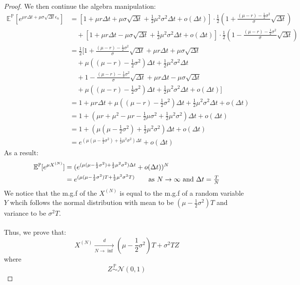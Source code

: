 \documentclass[12pt, letterpaper]{article}
\begin{document}
\begin{proof}
We then continue the algebra manipulation:
\begin{align*}
  \mathbb{E}^\mathbb{P} [e^{\mu r\Delta t+\mu\sigma \sqrt{\Delta t} \epsilon_n}] &= [1+\mu r\Delta t+\mu \sigma \sqrt{\Delta t} +\frac{1}{2}\mu^2\sigma^2\Delta t + o(\Delta t)] \cdot \frac{1}{2} (1 + \frac{(\mu -r) - \frac{1}{2}\sigma^2}{\sigma} \sqrt{\Delta t}) \\ 
    & \quad + [1+\mu r\Delta t-\mu \sigma \sqrt{\Delta t} +\frac{1}{2}\mu^2\sigma^2\Delta t + o(\Delta t)] \cdot \frac{1}{2} (1 - \frac{(\mu -r) - \frac{1}{2}\sigma^2}{\sigma} \sqrt{\Delta t}) \\
    &= \frac{1}{2}[ 1 + \frac{(\mu - r) - \frac{1}{2}\sigma^2}{\sigma}\sqrt{\Delta t} + \mu r \Delta t + \mu \sigma \sqrt{\Delta t} \\
    & \quad + \mu((\mu -r) - \frac{1}{2}\sigma^2)\Delta t + \frac{1}{2}\mu^2 \sigma^2 \Delta t \\
    & \quad + 1 - \frac{(\mu - r) - \frac{1}{2}\sigma^2}{\sigma}\sqrt{\Delta t} + \mu r \Delta t - \mu \sigma \sqrt{\Delta t} \\
    & \quad + \mu((\mu -r) - \frac{1}{2}\sigma^2)\Delta t + \frac{1}{2}\mu^2 \sigma^2 \Delta t + o(\Delta t)] \\
    &= 1 + \mu r \Delta t + \mu((\mu - r) - \frac{1}{2}\sigma^2)\Delta t + \frac{1}{2}\mu^2 \sigma^2 \Delta t + o(\Delta t) \\
    &= 1 + (\mu r + \mu^2 - \mu r -\frac{1}{2}\mu \sigma^2 + \frac{1}{2}\mu^2 \sigma^2)\Delta t + o(\Delta t) \\
    &= 1 + (\mu (\mu - \frac{1}{2}\sigma^2) + \frac{1}{2}\mu^2 \sigma^2)\Delta t + o(\Delta t)\\
    &= e^{(\mu (\mu - \frac{1}{2}\sigma^2) + \frac{1}{2}\mu^2 \sigma^2)\Delta t} + o(\Delta t)
\end{align*} 
As a result:
\begin{align*}
  \mathbb{E}^\mathbb{P}[e^{\mu X^{(N)}}] & = (e^{(\mu (\mu - \frac{1}{2}\sigma^2) + \frac{1}{2}\mu^2 \sigma^2)\Delta t} + o(\Delta t))^N\\
    &=  e^{(\mu (\mu - \frac{1}{2}\sigma^2)T + \frac{1}{2}\mu^2 \sigma^2T)} \tag*{as $N \rightarrow \infty$ and $\Delta t = \frac{T}{N}$}
\end{align*}
We notice that the m.g.f of the $X^{(N)}$ is equal to the m.g.f of a random variable $Y$ whcih follows the normal distribution with mean to be $(\mu - \frac{1}{2}\sigma^2)T$ and
variance to be $\sigma^2 T$.
\\ \\
Thus, we prove that:
\[X^{(N)} \xrightarrow[N \rightarrow \inf]{d} (\mu - \frac{1}{2}\sigma^2)T + \sigma^2 TZ\]
where 
\[Z \stackrel{\mathbb{P}}{\sim} \mathcal{N}(0, 1)\] 
\end{proof}
\end{document}
